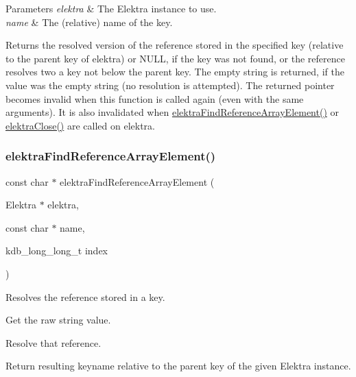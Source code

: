 \begin{DoxyParams}{Parameters}
{\em elektra} & The Elektra instance to use. \\
\hline
{\em name} & The (relative) name of the key. \\
\hline
\end{DoxyParams}
\begin{DoxyReturn}{Returns}
the resolved version of the reference stored in the specified key (relative to the parent key of {\ttfamily elektra}) or N\+U\+LL, if the key was not found, or the reference resolves two a key not below the parent key. The empty string is returned, if the value was the empty string (no resolution is attempted). The returned pointer becomes invalid when this function is called again (even with the same arguments). It is also invalidated when \hyperlink{group__highlevel_ga16e022b631da118ca67901495029a844}{elektra\+Find\+Reference\+Array\+Element()} or \hyperlink{group__highlevel_ga9b688b7250e5f9d8ea6701cc2cc269af}{elektra\+Close()} are called on {\ttfamily elektra}. 
\end{DoxyReturn}
\mbox{\label{group__highlevel_ga16e022b631da118ca67901495029a844}} 
\subsubsection{\texorpdfstring{elektra\+Find\+Reference\+Array\+Element()}{elektraFindReferenceArrayElement()}}
{\footnotesize\ttfamily const char $\ast$ elektra\+Find\+Reference\+Array\+Element (\begin{DoxyParamCaption}\item[{Elektra $\ast$}]{elektra,  }\item[{const char $\ast$}]{name,  }\item[{kdb\+\_\+long\+\_\+long\+\_\+t}]{index }\end{DoxyParamCaption})}



Resolves the reference stored in a key. 


\begin{DoxyEnumerate}
\item Get the raw string value.
\item Resolve that reference.
\item Return resulting keyname relative to the parent key of the given Elektra instance.
\end{DoxyEnumerate}

